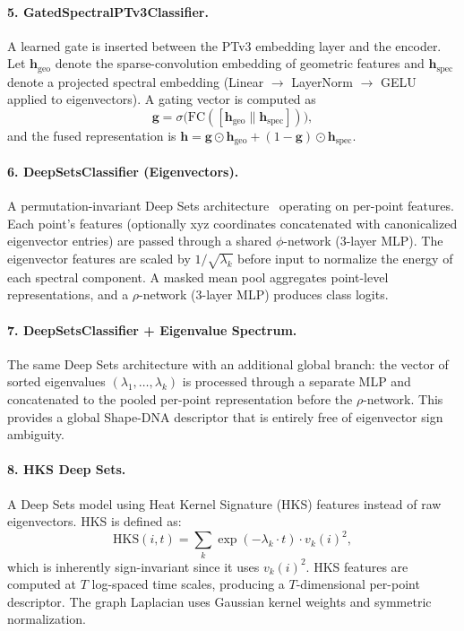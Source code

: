 \documentclass[11pt]{article}
\begin{document}
\paragraph{5. GatedSpectralPTv3Classifier.}
A learned gate is inserted between the PTv3 embedding layer and the encoder. Let
$\mathbf{h}_{\text{geo}}$ denote the sparse-convolution embedding of geometric features and
$\mathbf{h}_{\text{spec}}$ denote a projected spectral embedding (Linear $\to$ LayerNorm
$\to$ GELU applied to eigenvectors). A gating vector is computed as
\[
    \mathbf{g} = \sigma\!\bigl(\mathrm{FC}([\mathbf{h}_{\text{geo}} \| \mathbf{h}_{\text{spec}}])\bigr),
\]
and the fused representation is
$\mathbf{h} = \mathbf{g} \odot \mathbf{h}_{\text{geo}} + (1 - \mathbf{g}) \odot \mathbf{h}_{\text{spec}}$.

\paragraph{6. DeepSetsClassifier (Eigenvectors).}
A permutation-invariant Deep Sets architecture~\cite{zaheer2017deep} operating on per-point
features. Each point's features (optionally xyz coordinates concatenated with canonicalized
eigenvector entries) are passed through a shared $\phi$-network (3-layer MLP). The
eigenvector features are scaled by $1/\sqrt{\lambda_k}$ before input to normalize the
energy of each spectral component. A masked mean pool aggregates point-level
representations, and a $\rho$-network (3-layer MLP) produces class logits.

\paragraph{7. DeepSetsClassifier + Eigenvalue Spectrum.}
The same Deep Sets architecture with an additional global branch: the vector of sorted
eigenvalues $(\lambda_1, \ldots, \lambda_k)$ is processed through a separate MLP and
concatenated to the pooled per-point representation before the $\rho$-network. This
provides a global Shape-DNA descriptor that is entirely free of eigenvector sign ambiguity.

\paragraph{8. HKS Deep Sets.}
A Deep Sets model using Heat Kernel Signature (HKS) features instead of raw eigenvectors.
HKS is defined as:
\[
    \text{HKS}(i, t) = \sum_k \exp(-\lambda_k \cdot t) \cdot v_k(i)^2,
\]
which is inherently sign-invariant since it uses $v_k(i)^2$. HKS features are computed
at $T$ log-spaced time scales, producing a $T$-dimensional per-point descriptor. The
graph Laplacian uses Gaussian kernel weights and symmetric normalization.
\end{document}
